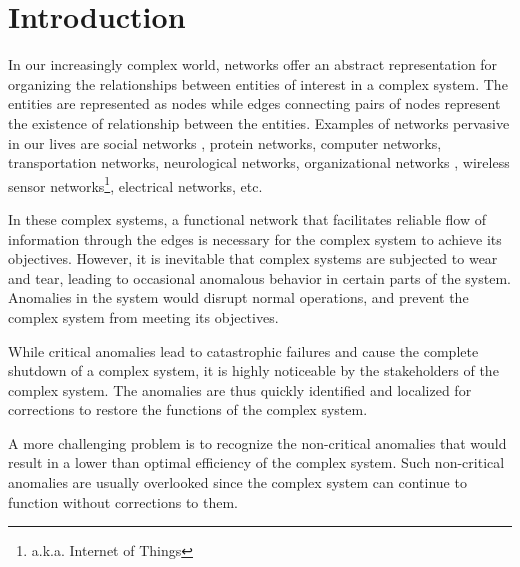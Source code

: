 \documentclass{sig-alternate}
\begin{document}
\section{Introduction}


In our increasingly complex world, networks offer an abstract representation for organizing the relationships between entities of interest in a complex system. The entities are represented as nodes while edges connecting pairs of nodes represent the existence of relationship between the entities. Examples of networks pervasive in our lives are social networks \cite{Wu2004}, protein networks, computer networks, transportation networks, neurological networks, organizational networks \cite{Mihm2010}, wireless sensor networks\footnote{a.k.a. Internet of Things}, electrical networks, etc. 

In these complex systems, a functional network that facilitates reliable flow of information through the edges is necessary for the complex system to achieve its objectives. However, it is inevitable that complex systems are subjected to wear and tear, leading to occasional anomalous behavior in certain parts of the system. Anomalies in the system would disrupt normal operations, and prevent the complex system from meeting its objectives.

While critical anomalies lead to catastrophic failures and cause the complete shutdown of a complex system, it is highly noticeable by the stakeholders of the complex system. The anomalies are thus quickly identified and localized for corrections to restore the functions of the complex system.

A more challenging problem is to recognize the non-critical anomalies that would result in a lower than optimal efficiency of the complex system. Such non-critical anomalies are usually overlooked since the complex system can continue to function without corrections to them. 
\end{document}
